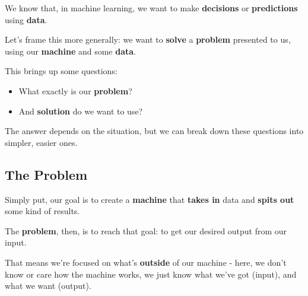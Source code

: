         We know that, in machine learning, we want to make \textbf{decisions} or \textbf{predictions} using \textbf{data}. 
        
        Let's frame this more generally: we want to \textbf{solve} a \textbf{problem} presented to us, using our \textbf{machine} and some \textbf{data}.
        
        This brings up some questions:
        
        \begin{itemize}
            \item What exactly is our \textbf{problem}?
            \item And \textbf{solution} do we want to use?
        \end{itemize}
        
        The answer depends on the situation, but we can break down these questions into simpler, easier ones.
        
        
    \subsection{The Problem}
    
        Simply put, our goal is to create a \textbf{machine} that \textbf{takes in} data and \textbf{spits out} some kind of results. 
        
        The \textbf{problem}, then, is to reach that goal: to get our desired output from our input.
        
        That means we're focused on what's \textbf{outside} of our machine - here, we don't know or care how the machine works, we just know what we've got (input), and what we want (output).
        
